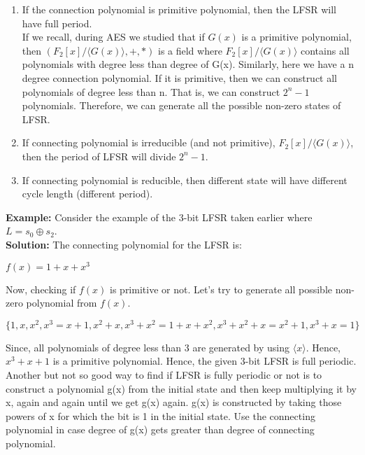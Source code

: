 \documentclass[11pt]{article}
\begin{document}
\begin{enumerate}
    \item If the connection polynomial is primitive polynomial, then the LFSR will have full period.\\
    \newline
    If we recall, during AES we studied that if $G(x)$ is a primitive polynomial, then $(F_2[x]/\langle G(x)\rangle, +, *)$ is a field where $F_2[x]/\langle G(x)\rangle$ contains all polynomials with degree less than degree of G(x). Similarly, here we have a n degree connection polynomial. If it is primitive, then we can construct all polynomials of degree less than n. That is, we can construct $2^n - 1$ polynomials. Therefore, we can generate all the possible non-zero states of LFSR.

    \item If connecting polynomial is irreducible (and not primitive), $F_2[x]/\langle G(x)\rangle$, then the period of LFSR will divide $2^n-1$.

    \item If connecting polynomial is reducible, then different state will have different cycle length (different period).
\end{enumerate}

\textbf{Example:} Consider the example of the 3-bit LFSR taken earlier where $L = s_0 \oplus s_2$.\\
\textbf{Solution:} The connecting polynomial for the LFSR is:
\begin{center}
    $f(x) = 1 + x + x^3$
\end{center}
Now, checking if $f(x)$ is primitive or not. Let's try to generate all possible non-zero polynomial from $f(x)$.
\begin{center}
    $\{1, x, x^2, x^3 = x + 1, x^2 + x, x^3 + x^2 = 1 + x + x^2, x^3 + x^2 + x = x^2 + 1, x^3 + x = 1\}$
\end{center}
Since, all polynomials of degree less than 3 are generated by using $\langle x \rangle$. Hence, $x^3 + x + 1$ is a primitive polynomial. Hence, the given 3-bit LFSR is full periodic.\\ 
Another but not so good way to find if LFSR is fully periodic or not is to construct a polynomial g(x) from the initial state and then keep multiplying it by x, again and again until we get g(x) again. g(x) is constructed by taking those powers of x for which the bit is 1 in the initial state. Use the connecting polynomial in case degree of g(x) gets greater than degree of connecting polynomial.
\end{document}

